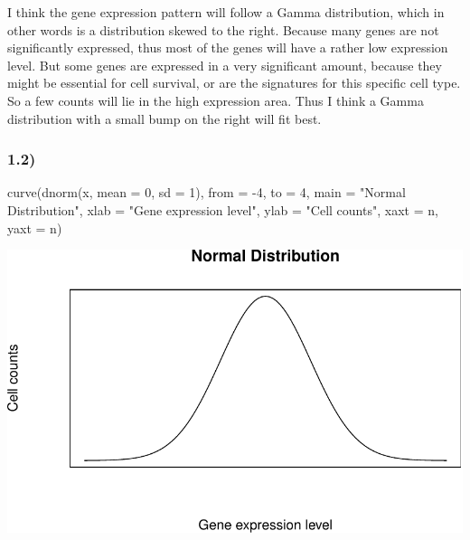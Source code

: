 \documentclass[
]{article}
\newenvironment{Shaded}{\begin{snugshade}}{\end{snugshade}}
\newcommand{\AttributeTok}[1]{\textcolor[rgb]{0.77,0.63,0.00}{#1}}
\newcommand{\DecValTok}[1]{\textcolor[rgb]{0.00,0.00,0.81}{#1}}
\newcommand{\FunctionTok}[1]{\textcolor[rgb]{0.00,0.00,0.00}{#1}}
\newcommand{\NormalTok}[1]{#1}
\newcommand{\SpecialCharTok}[1]{\textcolor[rgb]{0.00,0.00,0.00}{#1}}
\newcommand{\StringTok}[1]{\textcolor[rgb]{0.31,0.60,0.02}{#1}}
\begin{document}
I think the gene expression pattern will follow a Gamma distribution,
which in other words is a distribution skewed to the right. Because many
genes are not significantly expressed, thus most of the genes will have
a rather low expression level. But some genes are expressed in a very
significant amount, because they might be essential for cell survival,
or are the signatures for this specific cell type. So a few counts will
lie in the high expression area. Thus I think a Gamma distribution with
a small bump on the right will fit best.

\hypertarget{section-1}{%
\subsubsection{1.2)}\label{section-1}}

\begin{Shaded}
\begin{Highlighting}[]
\FunctionTok{curve}\NormalTok{(}\FunctionTok{dnorm}\NormalTok{(x, }\AttributeTok{mean =} \DecValTok{0}\NormalTok{, }\AttributeTok{sd =} \DecValTok{1}\NormalTok{), }
      \AttributeTok{from =} \SpecialCharTok{{-}}\DecValTok{4}\NormalTok{, }\AttributeTok{to =} \DecValTok{4}\NormalTok{,}
      \AttributeTok{main =} \StringTok{"Normal Distribution"}\NormalTok{,}
      \AttributeTok{xlab =} \StringTok{"Gene expression level"}\NormalTok{, }\AttributeTok{ylab =} \StringTok{"Cell counts"}\NormalTok{,}
      \AttributeTok{xaxt =} \StringTok{\textquotesingle{}n\textquotesingle{}}\NormalTok{, }\AttributeTok{yaxt =} \StringTok{\textquotesingle{}n\textquotesingle{}}\NormalTok{)}
\end{Highlighting}
\end{Shaded}

\begin{center}\includegraphics{hw4_files/figure-latex/unnamed-chunk-2-1} \end{center}
\end{document}
